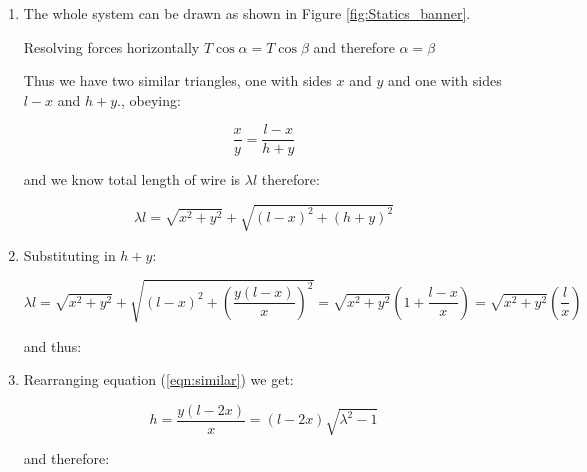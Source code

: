 \begin{problem}
{\begin{enumerate}
	\item The whole system can be drawn as shown in Figure \ref{fig:Statics_banner}.
	
	Resolving forces horizontally $T \cos\alpha = T \cos\beta$ and therefore $\alpha = \beta$
	
	Thus we have two similar triangles, one with sides $x$ and $y$ and one with sides $l - x$  and  $h + y$., obeying:
	
	\begin{equation}	\frac{x}{y} = \frac{l - x}{h + y}	
	\label{eqn:similar}
	\end{equation}
	
	and we know total length of wire is $\lambda l$ therefore:
	
	\begin{equation}	\lambda l = \sqrt{x^{2} + y^{2}} + \sqrt{{(l - x)}^{2} + {(h + y)}^{2}}  \end{equation}
	
	 \item Substituting in $h + y$:
	 
	 \begin{equation*}	\lambda l = \sqrt{x^{2} + y^{2}} + \sqrt{{(l - x)}^{2} + \left({\frac{y(l-x)}{x}}\right)^{2}} 
	 = \sqrt{x^{2} + y^{2}} \left( 1 + \frac{l-x}{x} \right)
	 = \sqrt{x^{2} + y^{2}} \left(\frac{l}{x} \right)\end{equation*}
	 
	 and thus:
	 
	 
	 \item Rearranging equation (\ref{eqn:similar}) we get:
	 
	  \begin{equation*}	h = \frac{y(l - 2x)}{x} =  (l - 2x)\sqrt{\lambda^2 - 1}   \end{equation*}
	  
	  and therefore:
	  
	   

\end{enumerate}}
\end{problem}
